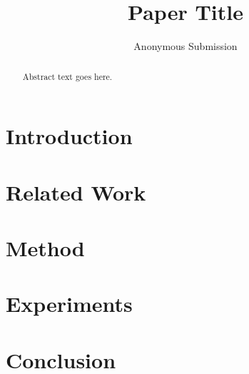 \documentclass[letterpaper]{article} %
\title{Paper Title}
\author{Anonymous Submission}
\begin{document}
\maketitle

\begin{abstract}
Abstract text goes here.
\end{abstract}

\section{Introduction}

\section{Related Work}

\section{Method}

\section{Experiments}

\section{Conclusion}


\end{document}
